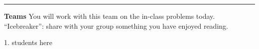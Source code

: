 \documentclass[12pt,letterpaper,noanswers]{exam}
\begin{document}
\vspace{0.2cm}
\hrule
\vspace{0.2cm}

















\noindent\textbf{Teams}
You will work with this team on the in-class problems today.  ``Icebreaker'': share with your group something you have enjoyed reading.
\begin{multicols}{2}
1.  students here


\end{multicols}
\end{document}
